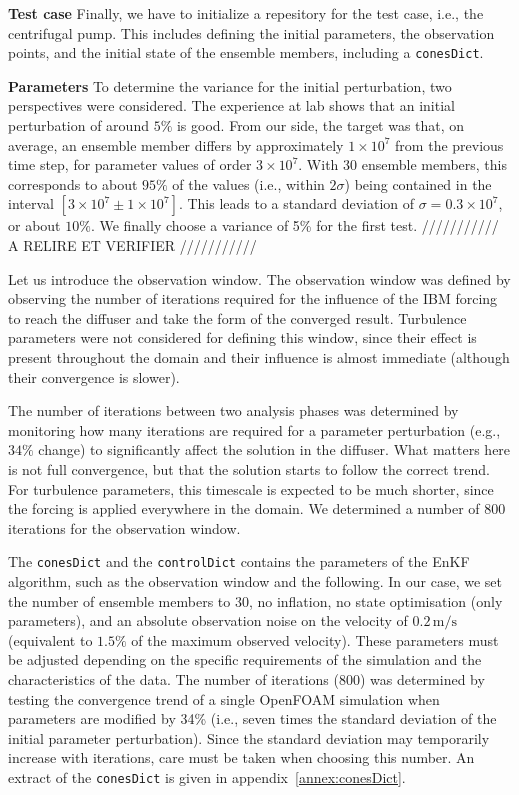 \textbf{Test case}
Finally, we have to initialize a repesitory for the test case, i.e., the centrifugal pump. This includes defining the initial parameters, the observation points, and the initial state of the ensemble members, including a \texttt{conesDict}.


\textbf{Parameters} To determine the variance for the initial perturbation, two perspectives were considered. The experience at lab shows that an initial perturbation of around $5\%$ is good. From our side, the target was that, on average, an ensemble member differs by approximately $1 \times 10^7$ from the previous time step, for parameter values of order $3 \times 10^7$. With 30 ensemble members, this corresponds to about $95\%$ of the values (i.e., within $2\sigma$) being contained in the interval $[3 \times 10^7 \pm 1 \times 10^7]$. This leads to a standard deviation of $\sigma = 0.3 \times 10^7$, or about $10\%$.
We finally choose a variance of 5\% for the first test. /////////// A RELIRE ET VERIFIER ///////////

Let us introduce the observation window.  
The observation window was defined by observing the number of iterations required for the influence of the IBM forcing to reach the diffuser and take the form of the converged result. Turbulence parameters were not considered for defining this window, since their effect is present throughout the domain and their influence is almost immediate (although their convergence is slower).  

The number of iterations between two analysis phases was determined by monitoring how many iterations are required for a parameter perturbation (e.g., $34\%$ change) to significantly affect the solution in the diffuser. What matters here is not full convergence, but that the solution starts to follow the correct trend. For turbulence parameters, this timescale is expected to be much shorter, since the forcing is applied everywhere in the domain.  
We determined a number of 800 iterations for the observation window.

The \texttt{conesDict} and the \texttt{controlDict} contains the parameters of the EnKF algorithm, such as the observation window and the following. In our case, we set the number of ensemble members to 30, no inflation, no state optimisation (only parameters), and an absolute observation noise on the velocity of $0.2 \, \text{m/s}$ (equivalent to $1.5\%$ of the maximum observed velocity). These parameters must be adjusted depending on the specific requirements of the simulation and the characteristics of the data. The number of iterations (800) was determined by testing the convergence trend of a single OpenFOAM simulation when parameters are modified by 34\% (i.e., seven times the standard deviation of the initial parameter perturbation). Since the standard deviation may temporarily increase with iterations, care must be taken when choosing this number.
An extract of the \texttt{conesDict} is given in appendix~\ref{annex:conesDict}.  

